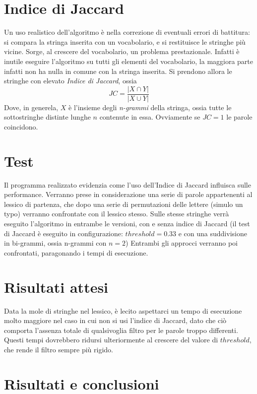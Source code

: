 \documentclass{article}
\begin{document}
 \section{Indice di Jaccard}
 Un uso realistico dell'algoritmo è nella correzione di eventuali errori di battitura: si compara la stringa inserita con un vocabolario, e si restituisce le stringhe più vicine. Sorge, al crescere del vocabolario, un problema prestazionale. Infatti è inutile eseguire l'algoritmo su tutti gli elementi del vocabolario, la maggiora parte infatti non ha nulla in comune con la stringa inserita. \newline
 Si prendono allora le stringhe con elevato \emph{Indice di Jaccard}, ossia $$JC = \frac{|X \cap Y| }{|X \cup Y|}$$
 Dove, in generela, $X$ è l'insieme degli \emph{n-grammi} della stringa, ossia tutte le sottostringhe distinte lunghe $n$ contenute in essa.
Ovviamente se $JC = 1$ le parole coincidono.
 
\section{Test}
Il programma realizzato evidenzia come l'uso dell'Indice di Jaccard influisca sulle performance. 
Verranno prese in considerazione una serie di parole appartenenti al lessico di partenza, che dopo una serie di permutazioni delle lettere (simulo un typo) verranno confrontate con il lessico stesso. Sulle stesse stringhe verrà eseguito l'algoritmo in entrambe le versioni, con e senza indice di Jaccard (il test di Jaccard è eseguito in configurazione: $threshold = 0.33$ e con una suddivisione in bi-grammi, ossia n-grammi con $n=2$) \newline
Entrambi gli approcci verranno poi confrontati, paragonando i tempi di esecuzione.

\section{Risultati attesi}
Data la mole di stringhe nel lessico, è lecito aspettarci un tempo di esecuzione molto maggiore nel caso in cui non si usi l'indice di Jaccard, dato che ciò comporta l'assenza totale di qualsivoglia filtro per le parole troppo differenti. \newline 
Questi tempi dovrebbero ridursi ulteriormente al crescere del valore di $threshold$, che rende il filtro sempre più rigido.
\newpage
\section{Risultati e conclusioni}
\end{document}
